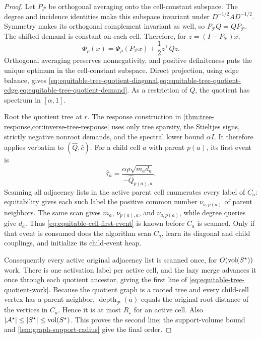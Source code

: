 \begin{proof}
Let $P_{\mathcal P}$ be orthogonal averaging onto the cell-constant subspace.
The degree and incidence identities make this subspace invariant under
$D^{-1/2}AD^{-1/2}$.  Symmetry makes its orthogonal complement invariant as
well, so $P_{\mathcal P}Q=QP_{\mathcal P}$.  The shifted demand is constant
on each cell.  Therefore, for $z=(I-P_{\mathcal P})x$,
\begin{equation*}
 \Phi_\rho(x)
 =\Phi_\rho(P_{\mathcal P}x)+\frac12z^\top Qz.
\end{equation*}
Orthogonal averaging preserves nonnegativity, and positive definiteness puts
the unique optimum in the cell-constant subspace.  Direct projection, using
edge balance, gives
\cref{eq:equitable-tree-quotient-diagonal,eq:equitable-tree-quotient-edge,eq:equitable-tree-quotient-demand}.
As a restriction of $Q$, the quotient has spectrum in $[\alpha,1]$.

Root the quotient tree at $r$.  The response construction in
\cref{thm:tree-response,cor:inverse-tree-response} uses only tree sparsity,
the Stieltjes signs, strictly negative nonroot demands, and the spectral lower
bound $\alpha I$.  It therefore applies verbatim to $(\widehat Q,\widehat c)$.
For a child cell $a$ with parent $p(a)$, its first event is
\begin{equation}
 \widehat\tau_a
 =\frac{\alpha\rho\sqrt{m_ad_a}}
        {-\widehat Q_{p(a),a}}.
 \label{eq:equitable-cell-first-event}
\end{equation}
Scanning all adjacency lists in the active parent cell enumerates every label
of $C_a$: equitability gives each such label the positive common number
$\nu_{a,p(a)}$ of parent neighbors.  The same scan gives $m_a$,
$\nu_{p(a),a}$, and $\nu_{a,p(a)}$, while degree queries give $d_a$.
Thus \cref{eq:equitable-cell-first-event} is known before $C_a$ is scanned.
Only if that event is consumed does the algorithm scan $C_a$, learn its
diagonal and child couplings, and initialize its child-event heap.

Consequently every active original adjacency list is scanned once, for
$O(\operatorname{vol}(S^\star))$ work.  There is one activation label per active cell, and
the lazy merge advances it once through each quotient ancestor, giving the
first line of \cref{eq:equitable-tree-quotient-work}.  Because the quotient
graph is a rooted tree and every child-cell vertex has a parent neighbor,
$\operatorname{depth}_{\mathcal P}(a)$ equals the original root distance of
the vertices in $C_a$.  Hence it is at most $R_\star$ for an active cell.
Also $|\mathcal A^\star|\leq|S^\star|\leq\operatorname{vol}(S^\star)$.  This proves the
second line; the support-volume bound and
\cref{lem:graph-support-radius} give the final order.


\end{proof}
